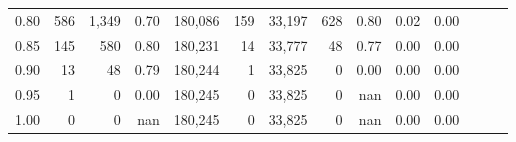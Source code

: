 \begin{tabular}{rrrrrrrrrrrrrr}
0.80 &     586 &  1,349 &  0.70 &  180,086 &      159 &  33,197 &     628 &  0.80 &  0.02 &      0.00 \\
0.85 &     145 &    580 &  0.80 &  180,231 &       14 &  33,777 &      48 &  0.77 &  0.00 &      0.00 \\
0.90 &      13 &     48 &  0.79 &  180,244 &        1 &  33,825 &       0 &  0.00 &  0.00 &      0.00 \\
0.95 &       1 &      0 &  0.00 &  180,245 &        0 &  33,825 &       0 &   nan &  0.00 &      0.00 \\
1.00 &       0 &      0 &   nan &  180,245 &        0 &  33,825 &       0 &   nan &  0.00 &      0.00 \\
\bottomrule
\end{tabular}
